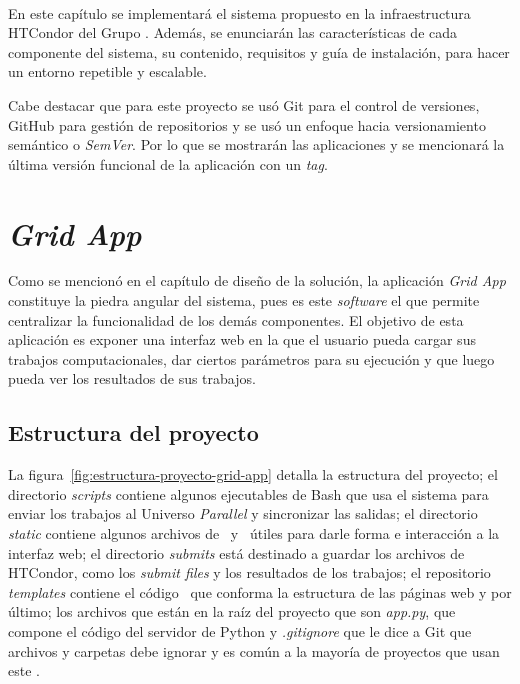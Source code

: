 \label{cap:pmv}
\mbox{}\\
En este capítulo se implementará el sistema propuesto en la infraestructura HTCondor del Grupo \GRID. Además, se enunciarán las características de cada componente del sistema, su contenido, requisitos y guía de instalación, para hacer un entorno repetible y escalable.

Cabe destacar que para este proyecto se usó Git para el control de versiones, GitHub para gestión de repositorios y se usó un enfoque hacia versionamiento semántico o \textit{SemVer}. Por lo que se mostrarán las aplicaciones y se mencionará la última versión funcional de la aplicación con un \textit{tag}.

\section{\textit{Grid App}}
\noindent
Como se mencionó en el capítulo de diseño de la solución, la aplicación \textit{Grid App} constituye la piedra angular del sistema, pues es este \textit{software} el que permite centralizar la funcionalidad de los demás componentes. El objetivo de esta aplicación es exponer una interfaz web en la que el usuario pueda cargar sus trabajos computacionales, dar ciertos parámetros para su ejecución y que luego pueda ver los resultados de sus trabajos.

\subsection{Estructura del proyecto}
\noindent
La figura~\ref{fig:estructura-proyecto-grid-app} detalla la estructura del proyecto; el directorio \textit{scripts} contiene algunos ejecutables de Bash que usa el sistema para enviar los trabajos al Universo \textit{Parallel} y sincronizar las salidas; el directorio \textit{static} contiene algunos archivos de \CSS~y \JS~útiles para darle forma e interacción a la interfaz web; el directorio \textit{submits} está destinado a guardar los archivos de HTCondor, como los \textit{submit files} y los resultados de los trabajos; el repositorio \textit{templates} contiene el código \HTML~que conforma la estructura de las páginas web y por último; los archivos que están en la raíz del proyecto que son \textit{app.py}, que compone el código del servidor de Python y \textit{.gitignore} que le dice a Git que archivos y carpetas debe ignorar y es común a la mayoría de proyectos que usan este \CVS.


